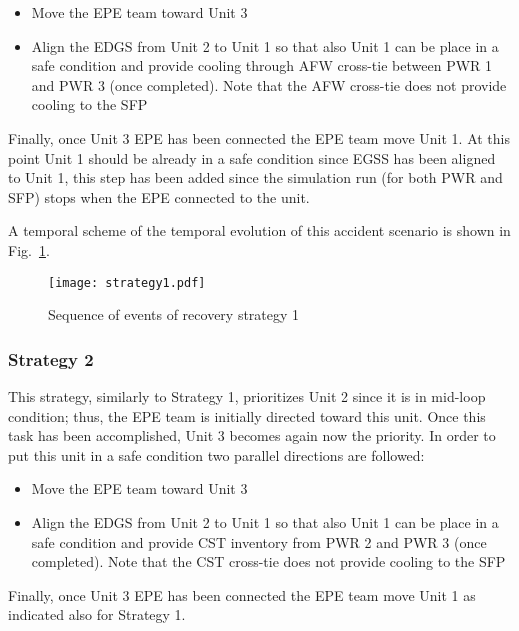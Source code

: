 \begin{itemize}
  \item Move the EPE team toward Unit 3 
  \item Align the EDGS from Unit 2 to Unit 1 so that also Unit 1 can be place in a safe condition and provide cooling 
        through AFW cross-tie between PWR 1 and PWR 3 (once completed). Note that the AFW cross-tie does not provide 
        cooling to the SFP
\end{itemize}

Finally, once Unit 3 EPE has been connected the EPE team move Unit 1. At this point Unit 1 should be already in a 
safe condition since EGSS has been aligned to Unit 1, this step has been added since the simulation run (for 
both PWR and SFP) stops when the EPE connected to the unit.

A temporal scheme of the temporal evolution of this accident scenario is shown in Fig.~\ref{fig:strategy1Scheme}.   

\begin{figure}
    \centering
    \centerline{\texttt{[image: strategy1.pdf]}}
    \caption{Sequence of events of recovery strategy 1}
    \label{fig:strategy1Scheme}
\end{figure}

\subsubsection{Strategy 2}
\label{sec:strategy2}

This strategy, similarly to Strategy 1, prioritizes Unit 2 since it is in mid-loop condition; thus, the EPE 
team is initially directed toward this unit. 
Once this task has been accomplished, Unit 3 becomes again now the priority. In order to put this unit in a safe 
condition two parallel directions are followed:

\begin{itemize}
  \item Move the EPE team toward Unit 3 
  \item Align the EDGS from Unit 2 to Unit 1 so that also Unit 1 can be place in a safe condition and provide 
        CST inventory from PWR 2 and PWR 3 (once completed). Note that the CST cross-tie does not provide cooling 
        to the SFP
\end{itemize}

Finally, once Unit 3 EPE has been connected the EPE team move Unit 1 as indicated also for Strategy 1.

